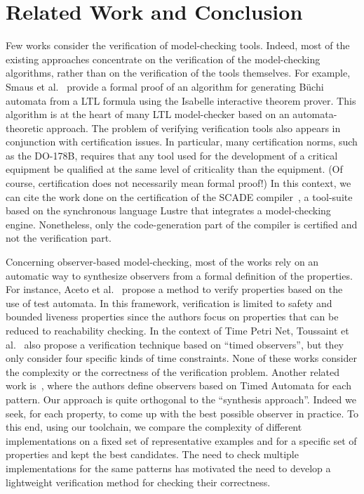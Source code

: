 \documentclass[a4paper]{scrartcl}
\begin{document}
\section{Related Work and Conclusion}
\label{sec 6:related-work}


Few works consider the verification of model-checking tools. Indeed,
most of the existing approaches concentrate on the verification of the
model-checking algorithms, rather than on the verification of the
tools themselves. For example, Smaus et al.~\cite{smaus09} provide a
formal proof of an algorithm for generating Büchi automata from a LTL
formula using the Isabelle interactive theorem prover. This algorithm
is at the heart of many LTL model-checker based on an
automata-theoretic approach. The problem of verifying verification
tools also appears in conjunction with certification issues. In
particular, many certification norms, such as the DO-178B, requires
that any tool used for the development of a critical equipment be
qualified at the same level of criticality than the equipment. (Of
course, certification does not necessarily mean formal proof!) In this
context, we can cite the work done on the certification of the SCADE
compiler~\cite{scade}, a tool-suite based on the synchronous language
Lustre that integrates a model-checking engine. Nonetheless, only the
code-generation part of the compiler is certified and not the
verification part.

Concerning observer-based model-checking, most of the works rely on an
automatic way to synthesize observers from a formal definition of the
properties. For instance, Aceto et al.~\cite{MCRTTA} propose a method
to verify properties based on the use of test automata. In this
framework, verification is limited to safety and bounded liveness
properties since the authors focus on properties that can be reduced
to reachability checking. In the context of Time Petri Net, Toussaint
et al.~\cite{TCVMBTPN} also propose a verification technique based on
``timed observers'', but they only consider four specific kinds of
time constraints. None of these works consider the complexity or the
correctness of the verification problem. Another related work
is~\cite{PTPS}, where the authors define observers based on Timed
Automata for each pattern.  Our approach is quite orthogonal to the
``synthesis approach''. Indeed we seek, for each property, to come up
with the best possible observer in practice. To this end, using our
toolchain, we compare the complexity of different implementations on a
fixed set of representative examples and for a specific set of
properties and kept the best candidates. The need to check multiple
implementations for the same patterns has motivated the need to
develop a lightweight verification method for checking their
correctness.  
\end{document}
